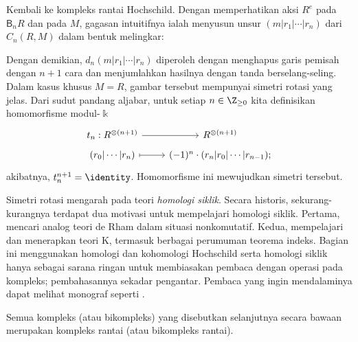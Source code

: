 Kembali ke kompleks rantai Hochschild. Dengan memperhatikan aksi $R^e$ pada
$\mathsf{B}_nR$ dan pada $M$, gagasan intuitifnya ialah menyusun unsur
$(m|r_1|\cdots|r_n)$ dari $C_n(R,M)$ dalam bentuk melingkar:
\begin{center}\end{center}
Dengan demikian, $d_n(m|r_1|\cdots|r_n)$ diperoleh dengan menghapus garis
pemisah dengan $n+1$ cara dan menjumlahkan hasilnya dengan tanda
berselang-seling. Dalam kasus khusus $M=R$, gambar tersebut mempunyai simetri
rotasi yang jelas. Dari sudut pandang aljabar, untuk setiap
$n\in\Z_{\geq0}$ kita definisikan homomorfisme modul-$\Bbbk$
\[\begin{tikzcd}[row sep=tiny]
	t_n: R^{\otimes (n+1)} \arrow[r] & R^{\otimes (n+1)} \\
	(r_0 | \cdots | r_n) \arrow[mapsto, r]
	& (-1)^n \cdot (r_n | r_0 | \cdots | r_{n-1}) ;
\end{tikzcd}\]
akibatnya, $t_n^{n+1}=\identity$. Homomorfisme ini mewujudkan simetri tersebut.

Simetri rotasi mengarah pada teori \emph{homologi siklik}. Secara historis,
sekurang-kurangnya terdapat dua motivasi untuk mempelajari homologi siklik.
Pertama, mencari analog teori de Rham dalam situasi nonkomutatif. Kedua,
mempelajari dan menerapkan teori K, termasuk berbagai perumuman teorema
indeks. Bagian ini menggunakan homologi dan kohomologi Hochschild serta
homologi siklik hanya sebagai sarana ringan untuk membiasakan
pembaca dengan operasi pada kompleks; pembahasannya sekadar pengantar.
Pembaca yang ingin mendalaminya dapat melihat monograf seperti
\cite{Lo98, Wi19}.

Semua kompleks (atau bikompleks) yang disebutkan selanjutnya secara bawaan
merupakan kompleks rantai (atau bikompleks rantai).

